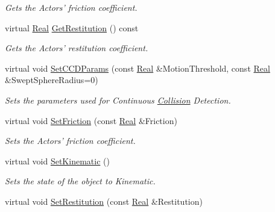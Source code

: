 \begin{DoxyCompactItemize}
\begin{DoxyCompactList}\small\item\em Gets the Actors' friction coefficient. \item\end{DoxyCompactList}\item 
virtual \hyperlink{namespaceMezzanine_a726731b1a7df72bf3583e4a97282c6f6}{Real} \hyperlink{classMezzanine_1_1ActorBasePhysicsSettings_a4e648f892ff2b5a8d111ab312cec394b}{GetRestitution} () const 
\begin{DoxyCompactList}\small\item\em Gets the Actors' restitution coefficient. \item\end{DoxyCompactList}\item 
virtual void \hyperlink{classMezzanine_1_1ActorBasePhysicsSettings_a702a20cfb7d87dbc2a7d44ba9260ead2}{SetCCDParams} (const \hyperlink{namespaceMezzanine_a726731b1a7df72bf3583e4a97282c6f6}{Real} \&MotionThreshold, const \hyperlink{namespaceMezzanine_a726731b1a7df72bf3583e4a97282c6f6}{Real} \&SweptSphereRadius=0)
\begin{DoxyCompactList}\small\item\em Sets the parameters used for Continuous \hyperlink{classMezzanine_1_1Collision}{Collision} Detection. \item\end{DoxyCompactList}\item 
virtual void \hyperlink{classMezzanine_1_1ActorBasePhysicsSettings_a615c423b6d2da96b16b91ee644b8b81c}{SetFriction} (const \hyperlink{namespaceMezzanine_a726731b1a7df72bf3583e4a97282c6f6}{Real} \&Friction)
\begin{DoxyCompactList}\small\item\em Sets the Actors' friction coefficient. \item\end{DoxyCompactList}\item 
virtual void \hyperlink{classMezzanine_1_1ActorBasePhysicsSettings_a3b01243f038e30eb39b04f8e38fb8a14}{SetKinematic} ()
\begin{DoxyCompactList}\small\item\em Sets the state of the object to Kinematic. \item\end{DoxyCompactList}\item 
virtual void \hyperlink{classMezzanine_1_1ActorBasePhysicsSettings_ac11357f16b6a30223d1794b4e4adf467}{SetRestitution} (const \hyperlink{namespaceMezzanine_a726731b1a7df72bf3583e4a97282c6f6}{Real} \&Restitution)

\end{DoxyCompactItemize}
